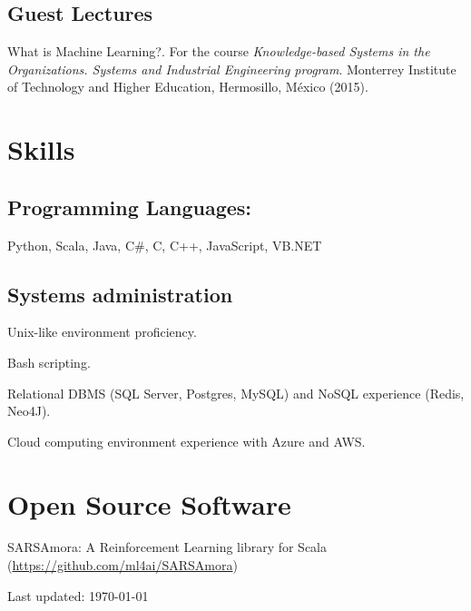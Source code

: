 \documentclass[letterpaper]{article}
\def\footerlink{http://jblevins.org/projects/cv-template/}
\renewenvironment{itemize}{
  \begin{list}{}{
    \setlength{\leftmargin}{1.5em}
  }
}{
  \end{list}
}
\begin{document}
\subsection*{Guest Lectures}
\begin{itemize}
	\item What is Machine Learning?. For the course \textit{Knowledge-based Systems in the Organizations. Systems and Industrial Engineering program}. Monterrey Institute of Technology and Higher Education, Hermosillo, M\'{e}xico (2015).
\end{itemize}


\section*{Skills}
\subsection*{Programming Languages:}
\begin{itemize}
	\item Python, Scala, Java, C\#, C, C++, JavaScript, VB.NET
\end{itemize}


\subsection*{Systems administration}
\begin{itemize}
	\item Unix-like environment proficiency.
	\item Bash scripting.
	\item Relational DBMS (SQL Server, Postgres, MySQL) and NoSQL experience (Redis, Neo4J).
	\item Cloud computing environment experience with Azure and AWS.
\end{itemize}

\section*{Open Source Software}
\begin{itemize}
	\item SARSAmora: A Reinforcement Learning library for Scala (\url{https://github.com/ml4ai/SARSAmora})
\end{itemize}
\bigskip

\begin{center}
  \begin{footnotesize}
    Last updated: \today \\
  \end{footnotesize}
\end{center}
\end{document}
